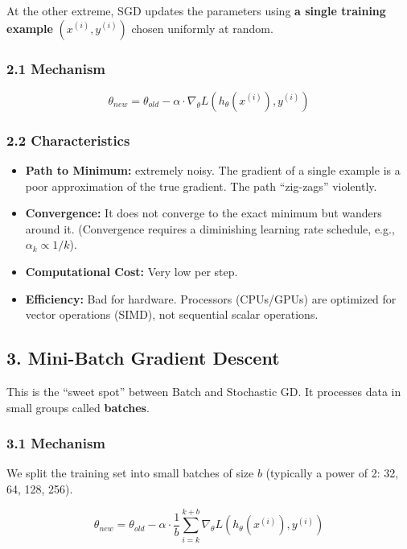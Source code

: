 \documentclass[
  italian,
  11pt,
]{article}
\begin{document}
At the other extreme, SGD updates the parameters using \textbf{a single
training example} \((x^{(i)}, y^{(i)})\) chosen uniformly at random.

\subsubsection{2.1 Mechanism}\label{mechanism-1}

\[\theta_{new} = \theta_{old} - \alpha \cdot \nabla_\theta L(h_\theta(x^{(i)}), y^{(i)})\]

\subsubsection{2.2 Characteristics}\label{characteristics-1}

\begin{itemize}
\item
  \textbf{Path to Minimum:} extremely noisy. The gradient of a single
  example is a poor approximation of the true gradient. The path
  ``zig-zags'' violently.
\item
  \textbf{Convergence:} It does not converge to the exact minimum but
  wanders around it. (Convergence requires a diminishing learning rate
  schedule, e.g., \(\alpha_k \propto 1/k\)).
\item
  \textbf{Computational Cost:} Very low per step.
\item
  \textbf{Efficiency:} Bad for hardware. Processors (CPUs/GPUs) are
  optimized for vector operations (SIMD), not sequential scalar
  operations.
\end{itemize}

\subsection{3. Mini-Batch Gradient
Descent}\label{mini-batch-gradient-descent}

This is the ``sweet spot'' between Batch and Stochastic GD. It processes
data in small groups called \textbf{batches}.

\subsubsection{3.1 Mechanism}\label{mechanism-2}

We split the training set into small batches of size \(b\) (typically a
power of 2: 32, 64, 128, 256).

\[\theta_{new} = \theta_{old} - \alpha \cdot \frac{1}{b} \sum_{i=k}^{k+b} \nabla_\theta L(h_\theta(x^{(i)}), y^{(i)})\]
\end{document}
